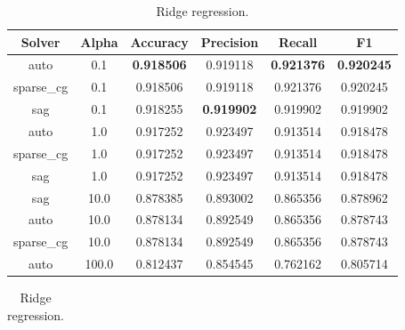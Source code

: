 \begin{appendices}
\begin{table}[ht]
\begin{subtable}{\textwidth}
\begin{adjustbox}{minipage=18cm, center}
\begin{tabular*}{\textwidth}{c @{\extracolsep{\fill}} ccccc}
\toprule
Solver      &  Alpha &  Accuracy &  Precision &    Recall &        F1 \\
\midrule
auto        &    0.1 &  \textbf{0.918506 }&   0.919118 &  \textbf{0.921376} &  \textbf{0.920245} \\
sparse\_cg  &    0.1 &  0.918506 &   0.919118 &  0.921376 &  0.920245 \\
sag         &    0.1 &  0.918255 &   \textbf{0.919902} &  0.919902 &  0.919902 \\
auto        &    1.0 &  0.917252 &   0.923497 &  0.913514 &  0.918478 \\
sparse\_cg  &    1.0 &  0.917252 &   0.923497 &  0.913514 &  0.918478 \\
sag         &    1.0 &  0.917252 &   0.923497 &  0.913514 &  0.918478 \\
sag         &   10.0 &  0.878385 &   0.893002 &  0.865356 &  0.878962 \\
auto        &   10.0 &  0.878134 &   0.892549 &  0.865356 &  0.878743 \\
sparse\_cg  &   10.0 &  0.878134 &   0.892549 &  0.865356 &  0.878743 \\
auto        &  100.0 &  0.812437 &   0.854545 &  0.762162 &  0.805714 \\
\bottomrule

\end{tabular*}
\caption{\label{tab:Ridge regression}Ridge regression.}
\end{adjustbox}
\end{subtable}


\bigskip
\begin{subtable}{\textwidth}
\begin{adjustbox}{minipage=18cm, center}
\centering
\begin{tabular*}{\textwidth}{c @{\extracolsep{\fill}} cccccc}


\end{tabular*}
\end{adjustbox}
\end{subtable}
\end{table}
\end{appendices}
